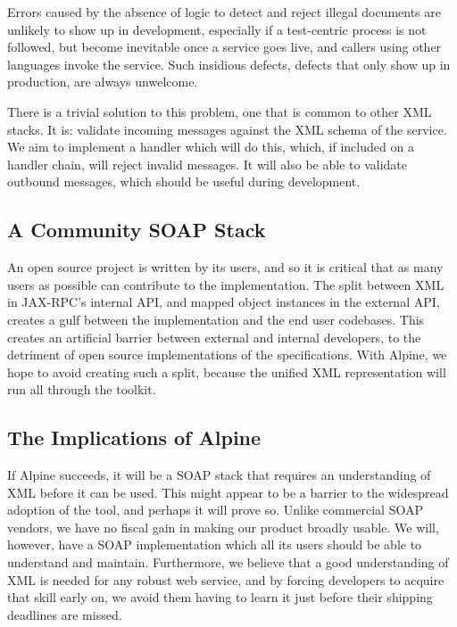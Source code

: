Errors caused by the absence of logic to detect and reject illegal
documents are unlikely to show up in development, especially if a
test-centric process is not followed, but become inevitable once a
service goes live, and callers using other languages invoke the
service. Such insidious defects, defects that only show up in
production, are always unwelcome.

There is a trivial solution to this problem, one that is common to
other XML stacks. It is: validate incoming messages against the XML
schema of the service.  We aim to implement a handler which will do
this, which, if included on a handler chain, will reject invalid
messages. It will also be able to validate outbound messages, which
should be useful during development. 

\subsection{A Community SOAP Stack}
\label{alpine:community}


An open source project is written by its users, and so it is critical that as
many users as possible can contribute to the implementation. The split between
XML in JAX-RPC's internal API, and mapped object instances in the external API,
creates a gulf between the implementation and the end user codebases. This
creates an artificial barrier between external and internal developers, to the
detriment of open source implementations of the specifications. With Alpine, we
hope to avoid creating such a split, because the unified XML representation will
run all through the toolkit.


\subsection{The Implications of Alpine}
\label{alpine:implications}

If Alpine succeeds, it will be a SOAP stack that requires an
understanding of XML before it can be used. This might appear to be a
barrier to the widespread adoption of the tool, and perhaps it will
prove so. Unlike commercial SOAP vendors, we have no fiscal gain in
making our product broadly usable. We will, however, have a SOAP
implementation which all its users should be able to understand and
maintain.  Furthermore, we believe that a good understanding of XML is
needed for any robust web service, and by forcing developers to
acquire that skill early on, we avoid them having to learn it just
before their shipping deadlines are missed.

